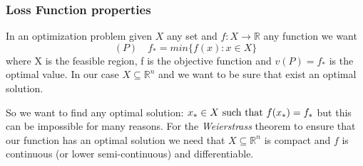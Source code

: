 \subsubsection{Loss Function properties}
\label{LF:Properties}
In an optimization problem given $X$ any set and $f: X \rightarrow \mathbb{R}$ any function we want
\begin{equation}
(P) \quad f_{*} = min \{f(x) : x \in X\}
\end{equation}
where X is the feasible region, f is the objective function and $v(P) = f_{*}$ is the optimal value. In our case $X \subseteq \mathbb{R}^{n}$ and we want to be sure that exist an optimal solution.

So we want to find any optimal solution: $x_{*} \in X  \textnormal{ such that } f(x_{*}) = f_{*}$ but this can be impossible for many reasons. For the \textit{Weierstrass} theorem to ensure that our function has an optimal solution we need that $X \subseteq \mathbb{R}^{n}$ is compact and $f$ is continuous (or lower semi-continuous) and differentiable. 

